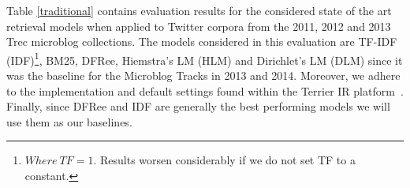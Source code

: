  Table \ref{traditional} contains evaluation results for the considered state of the art retrieval models when applied to Twitter corpora from the 2011, 2012 and 2013 Trec microblog collections. The models considered in this evaluation are TF-IDF (IDF)\footnote{\(Where~TF=1.\) Results worsen considerably if we do not set TF to a constant.}, BM25, DFRee, Hiemstra's LM (HLM) and Dirichlet's LM (DLM) since it was the baseline for the Microblog Tracks in 2013 and 2014. Moreover, we adhere to the implementation and default settings found within the Terrier IR platform~\cite{ounis2005terrier}. Finally, since DFRee and IDF are generally the best performing models we will use them as our baselines.



%

